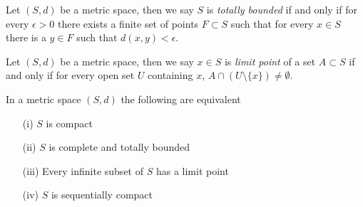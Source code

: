 \begin{defn}Let $(S,d)$ be a metric space, then we say $S$
  is \emph{totally bounded} if and only if for every $\epsilon >0$
  there exists a finite set of points $F \subset S$ such that for
  every $x\in S$ there is a $y \in F$ such that $d(x,y) < \epsilon$.
\end{defn}

\begin{defn}Let $(S,d)$ be a metric space, then we say $x \in S$
  is \emph{limit point} of a set $A \subset S$ if and only if for
  every open set $U$ containing $x$, $A \cap (U \setminus \lbrace x
  \rbrace) \neq \emptyset$.
\end{defn}

\begin{thm}\label{CompactnessInMetricSpaces}In a metric space $(S,d)$ the following are equivalent
\begin{itemize}
\item[(i)]$S$ is compact
\item[(ii)]$S$ is complete and totally bounded
\item[(iii)]Every infinite subset of $S$ has a limit point
\item[(iv)]$S$ is sequentially compact
\end{itemize}
\end{thm}
